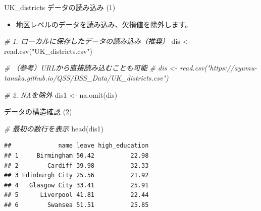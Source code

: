 \documentclass[
  ignorenonframetext,
]{beamer}
\newenvironment{Shaded}{\begin{snugshade}}{\end{snugshade}}
\newcommand{\CommentTok}[1]{\textcolor[rgb]{0.56,0.35,0.01}{\textit{#1}}}
\newcommand{\FunctionTok}[1]{\textcolor[rgb]{0.00,0.00,0.00}{#1}}
\newcommand{\NormalTok}[1]{#1}
\newcommand{\OtherTok}[1]{\textcolor[rgb]{0.56,0.35,0.01}{#1}}
\newcommand{\StringTok}[1]{\textcolor[rgb]{0.31,0.60,0.02}{#1}}
\providecommand{\tightlist}{%
  \setlength{\itemsep}{0pt}\setlength{\parskip}{0pt}}
\begin{document}
\begin{frame}[fragile]{UK\_districts データの読み込み (1)}
\protect\hypertarget{uk_districts-ux30c7ux30fcux30bfux306eux8aadux307fux8fbcux307f-1}{}
\begin{itemize}
\tightlist
\item
  地区レベルのデータを読み込み、欠損値を除外します。
\end{itemize}

\scriptsize

\begin{Shaded}
\begin{Highlighting}[]
\CommentTok{\# 1. ローカルに保存したデータの読み込み（推奨）}
\NormalTok{dis }\OtherTok{\textless{}{-}} \FunctionTok{read.csv}\NormalTok{(}\StringTok{"UK\_districts.csv"}\NormalTok{)}

\CommentTok{\# （参考）URLから直接読み込むことも可能}
\CommentTok{\# dis \textless{}{-} read.csv("https://ayumu{-}tanaka.github.io/QSS/DSS\_Data/UK\_districts.csv")}

\CommentTok{\# 2. NAを除外}
\NormalTok{dis1 }\OtherTok{\textless{}{-}} \FunctionTok{na.omit}\NormalTok{(dis)}
\end{Highlighting}
\end{Shaded}

\normalsize
\end{frame}

\begin{frame}[fragile]{データの構造確認 (2)}
\protect\hypertarget{ux30c7ux30fcux30bfux306eux69cbux9020ux78baux8a8d-2}{}
\scriptsize

\begin{Shaded}
\begin{Highlighting}[]
\CommentTok{\# 最初の数行を表示}
\FunctionTok{head}\NormalTok{(dis1)}
\end{Highlighting}
\end{Shaded}

\begin{verbatim}
##             name leave high_education
## 1     Birmingham 50.42          22.98
## 2        Cardiff 39.98          32.33
## 3 Edinburgh City 25.56          21.92
## 4   Glasgow City 33.41          25.91
## 5      Liverpool 41.81          22.44
## 6        Swansea 51.51          25.85
\end{verbatim}

\normalsize
\end{frame}
\end{document}
